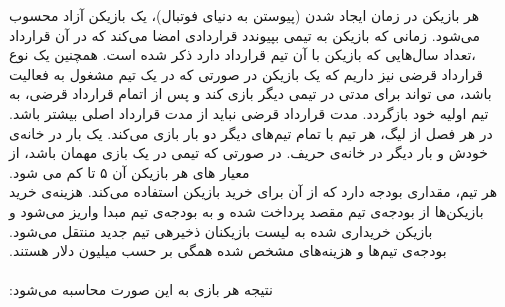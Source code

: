 \documentclass[]{article}
\begin{document}
ﻫﺮ ﺑﺎزﯾﮑﻦ در زﻣﺎن اﯾﺠﺎد ﺷﺪن (ﭘﯿﻮﺳﺘﻦ ﺑﻪ دﻧﯿﺎی ﻓﻮﺗﺒﺎل)‪ ،‬ﯾﮏ ﺑﺎزﯾﮑﻦ آزاد ﻣﺤﺴﻮب ﻣﯽﺷﻮد‪ .‬زﻣﺎﻧﯽ ﮐﻪ ﺑﺎزﯾﮑﻦ ﺑﻪ ﺗﯿﻤﯽ ﺑﭙﯿﻮﻧﺪد ‫ﻗﺮاردادی اﻣﻀﺎ ﻣﯽﮐﻨﺪ ﮐﻪ در آن ﻗﺮارداد‪ ،‬ﺗﻌﺪاد ﺳﺎلﻫﺎﯾﯽ ﮐﻪ ﺑﺎزﯾﮑﻦ ﺑﺎ آن ﺗﯿﻢ ﻗﺮارداد دارد ذﮐﺮ ﺷﺪه اﺳﺖ‪ .‬ﻫﻤﭽﻨﯿﻦ ﯾﮏ ﻧﻮع ‫ﻗﺮارداد ﻗﺮﺿﯽ ﻧﯿﺰ دارﯾﻢ ﮐﻪ ﯾﮏ ﺑﺎزﯾﮑﻦ در ﺻﻮرﺗﯽ ﮐﻪ در ﯾﮏ ﺗﯿﻢ ﻣﺸﻐﻮل ﺑﻪ ﻓﻌﺎﻟﯿﺖ ﺑﺎﺷﺪ‪ ،‬ﻣﯽ ﺗﻮاﻧﺪ ﺑﺮای ﻣﺪﺗﯽ در ﺗﯿﻤﯽ دﯾﮕﺮ ‫ﺑﺎزی ﮐﻨﺪ و ﭘﺲ از اﺗﻤﺎم ﻗﺮارداد ﻗﺮﺿﯽ‪ ،‬ﺑﻪ ﺗﯿﻢ اوﻟﯿﻪ ﺧﻮد ﺑﺎزﮔﺮدد‪ .‬ﻣﺪت ﻗﺮارداد ﻗﺮﺿﯽ ﻧﺒﺎﯾﺪ از ﻣﺪت ﻗﺮارداد اﺻﻠﯽ ﺑﯿﺸﺘﺮ ﺑﺎﺷﺪ‪.
\\
در ﻫﺮ ﻓﺼﻞ از ﻟﯿﮓ‪ ،‬ﻫﺮ ﺗﯿﻢ ﺑﺎ ﺗﻤﺎم ﺗﯿﻢﻫﺎی دﯾﮕﺮ دو ﺑﺎر ﺑﺎزی ﻣﯽﮐﻨﺪ‪ .‬ﯾﮏ ﺑﺎر در ﺧﺎﻧﻪی ﺧﻮدش و ﺑﺎر دﯾﮕﺮ در ﺧﺎﻧﻪی ﺣﺮﯾﻒ‪ .‬در ‫ﺻﻮرﺗﯽ ﮐﻪ ﺗﯿﻤﯽ در ﯾﮏ ﺑﺎزی ﻣﻬﻤﺎن ﺑﺎﺷﺪ‪ ،‬از ﻣﻌﯿﺎر ﻫﺎی ﻫﺮ ‫ﺑﺎزﯾﮑﻦ آن ‪ ۵‬ﺗﺎ ﮐﻢ ﻣﯽ ﺷﻮد.
\\
ﻫﺮ ﺗﯿﻢ‪ ،‬ﻣﻘﺪاری ﺑﻮدﺟﻪ دارد ﮐﻪ از آن ﺑﺮای ﺧﺮﯾﺪ ﺑﺎزﯾﮑﻦ اﺳﺘﻔﺎده ﻣﯽﮐﻨﺪ‪ .‬ﻫﺰﯾﻨﻪی ﺧﺮﯾﺪ ﺑﺎزﯾﮑﻦﻫﺎ از ﺑﻮدﺟﻪی ﺗﯿﻢ ﻣﻘﺼﺪ ‫ﭘﺮداﺧﺖ ﺷﺪه و ﺑﻪ ﺑﻮدﺟﻪی ﺗﯿﻢ ﻣﺒﺪا وارﯾﺰ ﻣﯽﺷﻮد و ﺑﺎزﯾﮑﻦ ﺧﺮﯾﺪاری ﺷﺪه ﺑﻪ ﻟﯿﺴﺖ ﺑﺎزﯾﮑﻨﺎن ذﺧﯿﺮهی ﺗﯿﻢ ﺟﺪﯾﺪ ﻣﻨﺘﻘﻞ ﻣﯽﺷﻮد‪.‬‬
\\
‫ﺑﻮدﺟﻪی ﺗﯿﻢﻫﺎ و ﻫﺰﯾﻨﻪﻫﺎی ﻣﺸﺨﺺ ﺷﺪه ﻫﻤﮕﯽ ﺑﺮ ﺣﺴﺐ ﻣﯿﻠﯿﻮن دﻻر ﻫﺴﺘﻨﺪ.
\\\\
‫ﻧﺘﯿﺠﻪ ﻫﺮ ﺑﺎزی ﺑﻪ اﯾﻦ ﺻﻮرت ﻣﺤﺎﺳﺒﻪ ﻣﯽﺷﻮد‪:‬‬
\\
\end{document}

